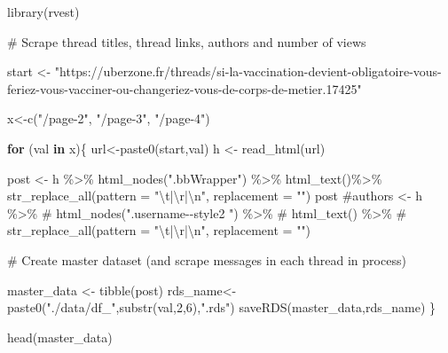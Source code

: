\documentclass[
  letterpaper,
  DIV=11,
  numbers=noendperiod]{scrreprt}
\newenvironment{Shaded}{\begin{snugshade}}{\end{snugshade}}
\newcommand{\AttributeTok}[1]{\textcolor[rgb]{0.40,0.45,0.13}{#1}}
\newcommand{\CommentTok}[1]{\textcolor[rgb]{0.37,0.37,0.37}{#1}}
\newcommand{\ControlFlowTok}[1]{\textcolor[rgb]{0.00,0.23,0.31}{\textbf{#1}}}
\newcommand{\DecValTok}[1]{\textcolor[rgb]{0.68,0.00,0.00}{#1}}
\newcommand{\FunctionTok}[1]{\textcolor[rgb]{0.28,0.35,0.67}{#1}}
\newcommand{\NormalTok}[1]{\textcolor[rgb]{0.00,0.23,0.31}{#1}}
\newcommand{\OtherTok}[1]{\textcolor[rgb]{0.00,0.23,0.31}{#1}}
\newcommand{\SpecialCharTok}[1]{\textcolor[rgb]{0.37,0.37,0.37}{#1}}
\newcommand{\StringTok}[1]{\textcolor[rgb]{0.13,0.47,0.30}{#1}}
\begin{document}
\begin{Shaded}
\begin{Highlighting}[]
\FunctionTok{library}\NormalTok{(rvest)}

\CommentTok{\# Scrape thread titles, thread links, authors and number of views}

\NormalTok{start }\OtherTok{\textless{}{-}} \StringTok{"https://uberzone.fr/threads/si{-}la{-}vaccination{-}devient{-}obligatoire{-}vous{-}feriez{-}vous{-}vacciner{-}ou{-}changeriez{-}vous{-}de{-}corps{-}de{-}metier.17425"}

\NormalTok{x}\OtherTok{\textless{}{-}}\FunctionTok{c}\NormalTok{(}\StringTok{"/page{-}2"}\NormalTok{, }\StringTok{"/page{-}3"}\NormalTok{, }\StringTok{"/page{-}4"}\NormalTok{)}

\ControlFlowTok{for}\NormalTok{ (val }\ControlFlowTok{in}\NormalTok{ x)\{}
\NormalTok{  url}\OtherTok{\textless{}{-}}\FunctionTok{paste0}\NormalTok{(start,val)}
\NormalTok{  h }\OtherTok{\textless{}{-}} \FunctionTok{read\_html}\NormalTok{(url)}

\NormalTok{post }\OtherTok{\textless{}{-}}\NormalTok{ h }\SpecialCharTok{\%\textgreater{}\%}
  \FunctionTok{html\_nodes}\NormalTok{(}\StringTok{".bbWrapper"}\NormalTok{) }\SpecialCharTok{\%\textgreater{}\%}
  \FunctionTok{html\_text}\NormalTok{()}\SpecialCharTok{\%\textgreater{}\%}
      \FunctionTok{str\_replace\_all}\NormalTok{(}\AttributeTok{pattern =} \StringTok{"}\SpecialCharTok{\textbackslash{}t}\StringTok{|}\SpecialCharTok{\textbackslash{}r}\StringTok{|}\SpecialCharTok{\textbackslash{}n}\StringTok{"}\NormalTok{, }\AttributeTok{replacement =} \StringTok{""}\NormalTok{)}
\NormalTok{post}
\CommentTok{\#authors \textless{}{-} h \%\textgreater{}\%}
\CommentTok{\#  html\_nodes(".username{-}{-}style2 ") \%\textgreater{}\%}
\CommentTok{\#  html\_text() \%\textgreater{}\%}
\CommentTok{\#  str\_replace\_all(pattern = "\textbackslash{}t|\textbackslash{}r|\textbackslash{}n", replacement = "")}

\CommentTok{\# Create master dataset (and scrape messages in each thread in process)}

\NormalTok{master\_data }\OtherTok{\textless{}{-}} 
  \FunctionTok{tibble}\NormalTok{(post)}
\NormalTok{rds\_name}\OtherTok{\textless{}{-}}\FunctionTok{paste0}\NormalTok{(}\StringTok{"./data/df\_"}\NormalTok{,}\FunctionTok{substr}\NormalTok{(val,}\DecValTok{2}\NormalTok{,}\DecValTok{6}\NormalTok{),}\StringTok{".rds"}\NormalTok{)}
\FunctionTok{saveRDS}\NormalTok{(master\_data,rds\_name)}
\NormalTok{\}}

\FunctionTok{head}\NormalTok{(master\_data)}
\end{Highlighting}
\end{Shaded}
\end{document}
